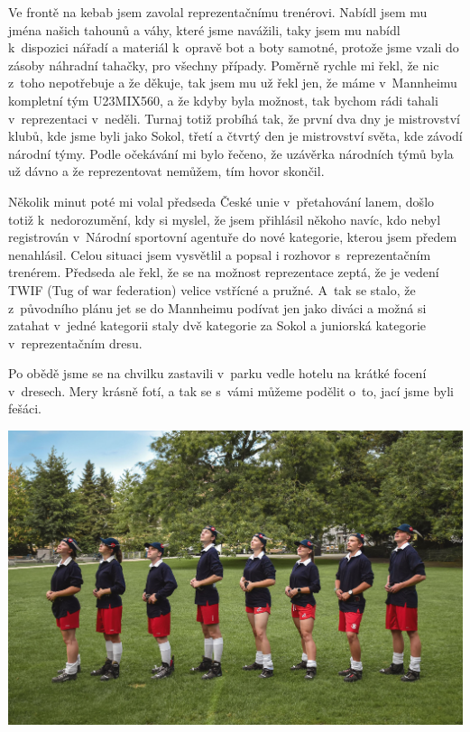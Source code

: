 \documentclass[11pt]{article}
\begin{document}
Ve frontě na kebab jsem zavolal reprezentačnímu trenérovi. Nabídl jsem mu jména našich tahounů a váhy, které jsme navážili, taky jsem mu nabídl k~dispozici nářadí a materiál k~opravě bot a boty samotné, protože jsme vzali do zásoby náhradní tahačky, pro všechny případy. Poměrně rychle mi řekl, že nic z~toho nepotřebuje a že děkuje, tak jsem mu už řekl jen, že máme v~Mannheimu kompletní tým U23MIX560, a že kdyby byla možnost, tak bychom rádi tahali v~reprezentaci v~neděli. Turnaj totiž probíhá tak, že první dva dny je mistrovství klubů, kde jsme byli jako Sokol, třetí a čtvrtý den je mistrovství světa, kde závodí národní týmy. Podle očekávání mi bylo řečeno, že uzávěrka národních týmů byla už dávno a že reprezentovat nemůžem, tím hovor skončil.

Několik minut poté mi volal předseda České unie v~přetahování lanem, došlo totiž k~nedorozumění, kdy si myslel, že jsem přihlásil někoho navíc, kdo nebyl registrován v~Národní sportovní agentuře do nové kategorie, kterou jsem předem nenahlásil. Celou situaci jsem vysvětlil a popsal i rozhovor s~reprezentačním trenérem. Předseda ale řekl, že se na možnost reprezentace zeptá, že je vedení TWIF (Tug of war federation) velice vstřícné a pružné. A~tak se stalo, že z~původního plánu jet se do Mannheimu podívat jen jako diváci a možná si zatahat v~jedné kategorii staly dvě kategorie za Sokol a juniorská kategorie v~reprezentačním dresu.

Po obědě jsme se na chvilku zastavili v~parku vedle hotelu na krátké focení v~dresech. Mery krásně fotí, a tak se s~vámi můžeme podělit o~to, jací jsme byli fešáci.

\begin{center}
  \includegraphics[width=\linewidth]{./lano-team.jpg}
\end{center}
\end{document}
